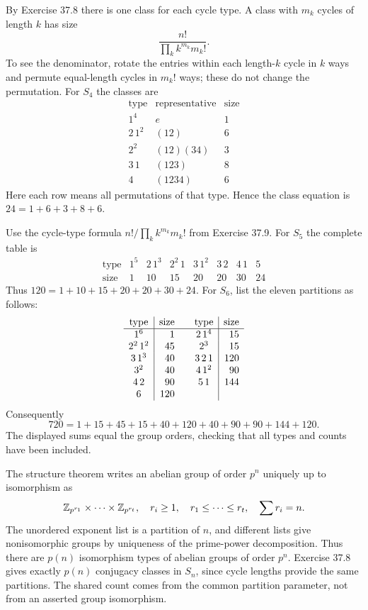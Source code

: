 By Exercise 37.8 there is one class for each cycle type. A class with $m_k$ cycles of length $k$ has size
\[
\frac{n!}{\prod_k k^{m_k}m_k!}.
\]
To see the denominator, rotate the entries within each length-$k$ cycle in $k$ ways and permute equal-length cycles in $m_k!$ ways; these do not change the permutation.
For $S_4$ the classes are
\[
\begin{array}{c|c|r}
\text{type}&\text{representative}&\text{size}\\\hline
1^4&e&1\\2\,1^2&(12)&6\\2^2&(12)(34)&3\\
3\,1&(123)&8\\4&(1234)&6
\end{array}
\]
Here each row means all permutations of that type. Hence the class equation is $24=1+6+3+8+6$.

Use the cycle-type formula $n!/\prod_k k^{m_k}m_k!$ from Exercise 37.9.
For $S_5$ the complete table is
\[
\begin{array}{c|rrrrrrr}
\text{type}&1^5&2\,1^3&2^2\,1&3\,1^2&3\,2&4\,1&5\\\hline
\text{size}&1&10&15&20&20&30&24
\end{array}
\]
Thus $120=1+10+15+20+20+30+24$.
For $S_6$, list the eleven partitions as follows:
\[
\begin{array}{c|r@{\qquad}c|r}
\text{type}&\text{size}&\text{type}&\text{size}\\\hline
1^6&1&2\,1^4&15\\
2^2\,1^2&45&2^3&15\\
3\,1^3&40&3\,2\,1&120\\
3^2&40&4\,1^2&90\\
4\,2&90&5\,1&144\\
6&120&&
\end{array}
\]
Consequently
\[
720=1+15+45+15+40+120+40+90+90+144+120.
\]
The displayed sums equal the group orders, checking that all types and counts have been included.

The structure theorem writes an abelian group of order $p^n$ uniquely up to isomorphism as
\[
\mathbb{Z}_{p^{r_1}}\times\cdots\times\mathbb{Z}_{p^{r_t}},
\quad r_i\ge1,\quad r_1\le\cdots\le r_t,\quad\sum r_i=n.
\]
The unordered exponent list is a partition of $n$, and different lists give nonisomorphic groups by uniqueness of the prime-power decomposition. Thus there are $p(n)$ isomorphism types of abelian groups of order $p^n$.
Exercise 37.8 gives exactly $p(n)$ conjugacy classes in $S_n$, since cycle lengths provide the same partitions. The shared count comes from the common partition parameter, not from an asserted group isomorphism.

